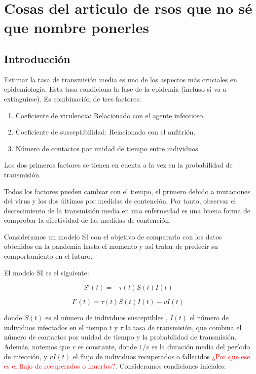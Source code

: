\section{Cosas del articulo de rsos que no sé que nombre ponerles}

\subsection{Introducción}

Estimar la tasa de transmisión media es uno de los aspectos más cruciales en epidemiología. Esta tasa condiciona la fase de la epidemia (incluso si va a extinguirse). Es combinación de tres factores:

\begin{enumerate}
\item Coeficiente de virulencia: Relacionado con el agente infeccioso.
\item Coeficiente de susceptibilidad: Relacionado con el anfitrión.
\item Número de contactos por unidad de tiempo entre individuos.
\end{enumerate}

Los dos primeros factores se tienen en cuenta a la vez en la probabilidad de transmisión.

Todos los factores pueden cambiar con el tiempo, el primero debido a mutaciones del virus y los dos últimos por medidas de contención. Por tanto, observar el decrecimiento de la transmisión media en una enfermedad es una buena forma de comprobar la efectividad de las medidas de contención.

Consideramos un modelo SI con el objetivo de compararlo con los datos obtenidos en la pandemia hasta el momento y así tratar de predecir su comportamiento en el futuro.

El modelo SI es el siguiente:

\begin{equation}
\label{eqn: SI_S_cont}
S'(t) = -\tau (t)S(t)I(t)
\end{equation}

\begin{equation}
\label{eqn: SI_I_cont}
I'(t) = \tau (t)S(t)I(t) -vI(t)
\end{equation}

donde $S(t)$ es el número de individuos susceptibles , $I(t)$ el número de individuos infectados en el tiempo $t$ y $\tau$ la tasa de transmisión, que combina el número de contactos por unidad de tiempo y la probabilidad de transmisión. Además, notemos que $v$ es constante, donde $1/v$ es la duración media del período de infección, y $vI(t)$ el flujo de individuos recuperados o fallecidos \textcolor{red}{¿Por que ese es el flujo de recuperados o muertos?}. Consideramos condiciones iniciales:

